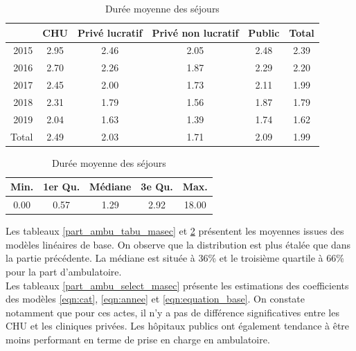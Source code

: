 \begin{table}[!ht]
\centering
\caption{Durée moyenne des séjours} 
\label{dms_tabu_masec}
\begin{tabular}{r|cccc|c}
  \hline
 & CHU & Privé lucratif & Privé non lucratif & Public & Total \\ 
  \hline
2015 & 2.95 & 2.46 & 2.05 & 2.48 & 2.39 \\ 
  2016 & 2.70 & 2.26 & 1.87 & 2.29 & 2.20 \\ 
  2017 & 2.45 & 2.00 & 1.73 & 2.11 & 1.99 \\ 
  2018 & 2.31 & 1.79 & 1.56 & 1.87 & 1.79 \\ 
  2019 & 2.04 & 1.63 & 1.39 & 1.74 & 1.62 \\ 
  \hline
  Total & 2.49 & 2.03 & 1.71 & 2.09 & 1.99 \\ 
   \hline
\end{tabular}

\bigskip

\begin{tabular}{ccccc}
  \hline
Min. & 1er Qu. & Médiane & 3e Qu. & Max. \\ 
  \hline
0.00 & 0.57 & 1.29 & 2.92 & 18.00 \\ 
   \hline
\end{tabular}
\end{table}

Les tableaux \ref{part_ambu_tabu_masec} et \ref{dms_tabu_masec} présentent les moyennes issues des modèles linéaires de base. On observe que la distribution est plus étalée que dans la partie précédente. La médiane est située à 36\% et le troisième quartile à 66\% pour la part d'ambulatoire.\\

Les tableaux \ref{part_ambu_select_masec} présente les estimations des coefficients des modèles \ref{eqn:cat}, \ref{eqn:annee} et \ref{eqn:equation_base}. On constate notamment que pour ces actes, il n'y a pas de différence significatives entre les CHU et les cliniques privées. Les hôpitaux publics ont également tendance à être moins performant en terme de prise en charge en ambulatoire.


